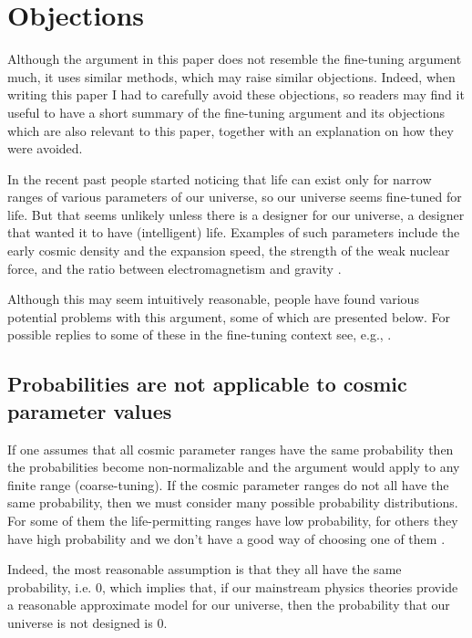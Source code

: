 \documentclass[a4paper
,draft
]{article}
\newcommand{\ghilimele}[1]{``#1"}
\begin{document}
\section{Objections}
\label{sec:fine-tuning}

Although the argument in this paper does not resemble the fine-tuning argument
much, it uses similar methods, which may raise similar objections. Indeed,
when writing this paper I had to carefully avoid these objections, so readers
may find it useful to have a short summary of the fine-tuning argument and its
objections which are also relevant to this paper, together with an explanation
on how they were avoided.

In the recent past people started noticing that life can exist only for
narrow ranges of various parameters of our universe, so our universe
seems fine-tuned for life.
But that seems unlikely unless there is a designer for our universe,
a designer that wanted it to have (intelligent) life.
Examples of such parameters include the early cosmic density and
the expansion speed, the strength of the weak nuclear force, and
the ratio between electromagnetism and gravity \parencite{Leslie2003}.

Although this may seem intuitively reasonable, people have found various
potential problems with this argument, some of which are presented below.
For possible replies to some of these in the fine-tuning context see,
e.g., \textcites{Leslie2003}{Swinburne2003}{Monton2006}{Kotzen2012}.

\subsection{Probabilities are not applicable to cosmic parameter values}

If one assumes that all cosmic parameter ranges have the same probability
then the probabilities become non-normalizable and the argument
would apply to any finite range (coarse-tuning).
If the cosmic parameter ranges do not all have the same probability,
then we must consider many possible probability distributions.
For some of them the life-permitting ranges have low probability,
for others they have high probability and we don't have a good way
of choosing one of them \parencites{Manson2009}{McGrew2001}.

Indeed, the most reasonable assumption is that they all have the same
probability, i.e. $0$, which implies that, if our mainstream physics theories
provide a reasonable approximate model for our universe, then the probability
that our universe is not designed is $0$.
\end{document}
